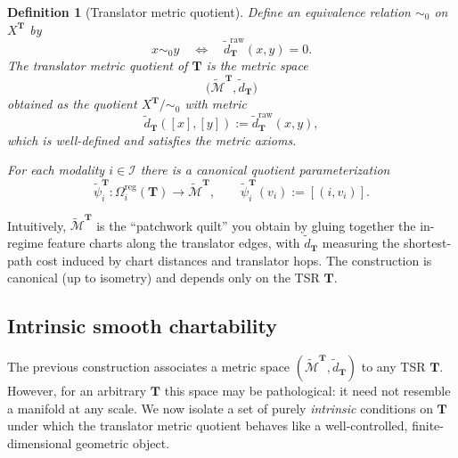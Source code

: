 \documentclass[11pt]{article}
\newtheorem{definition}{Definition}
\begin{document}
\begin{definition}[Translator metric quotient]
\label{def:translator-metric-quotient}
Define an equivalence relation $\sim_0$ on $X^{\mathbf{T}}$ by
\[
x \sim_0 y
\quad\Longleftrightarrow\quad
\tilde d_{\mathbf{T}}^{\mathrm{raw}}(x,y) = 0.
\]
The \emph{translator metric quotient} of $\mathbf{T}$ is the metric space
\[
\bigl(
  \widetilde{\mathcal{M}}^{\mathbf{T}},
  \tilde d_{\mathbf{T}}
\bigr)
\]
obtained as the quotient $X^{\mathbf{T}} / \sim_0$ with metric
\[
\tilde d_{\mathbf{T}}([x], [y])
:=
\tilde d_{\mathbf{T}}^{\mathrm{raw}}(x,y),
\]
which is well-defined and satisfies the metric axioms.

For each modality $i \in \mathcal{I}$ there is a canonical
\emph{quotient parameterization}
\[
\tilde\psi_i^{\mathbf{T}} : \Omega_i^{\mathrm{reg}}(\mathbf{T}) \to
\widetilde{\mathcal{M}}^{\mathbf{T}},
\qquad
\tilde\psi_i^{\mathbf{T}}(v_i) := [(i, v_i)].
\]
\end{definition}

Intuitively, $\widetilde{\mathcal{M}}^{\mathbf{T}}$ is the ``patchwork
quilt'' you obtain by gluing together the in-regime feature charts
along the translator edges, with $\tilde d_{\mathbf{T}}$ measuring the
shortest-path cost induced by chart distances and translator hops.
The construction is canonical (up to isometry) and depends only on the
TSR $\mathbf{T}$.

\subsection{Intrinsic smooth chartability}
\label{subsec:intrinsic-chartability}

The previous construction associates a metric space
$(\widetilde{\mathcal{M}}^{\mathbf{T}}, \tilde d_{\mathbf{T}})$ to any
TSR $\mathbf{T}$.  However, for an arbitrary $\mathbf{T}$ this space
may be pathological: it need not resemble a manifold at any scale.
We now isolate a set of purely \emph{intrinsic} conditions on
$\mathbf{T}$ under which the translator metric quotient behaves like
a well-controlled, finite-dimensional geometric object.
\end{document}
